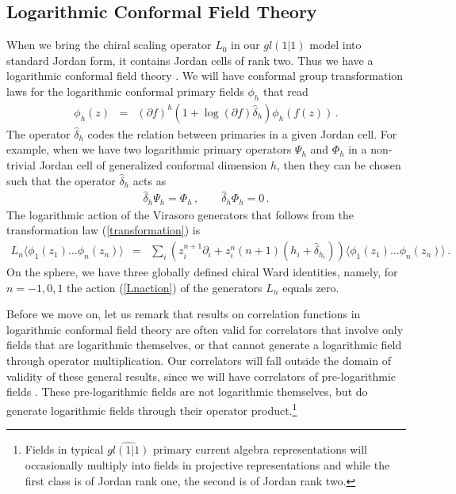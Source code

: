 \documentclass[12pt]{article}
\numberwithin{equation}{section}
\numberwithin{equation}{section}
\numberwithin{table}{section}\setlength{\multlinegap}{25pt}
\begin{document}
\subsection{Logarithmic Conformal Field Theory}
When we bring the chiral scaling operator $L_0$ in our $gl(1|1)$ model into standard Jordan form, it contains Jordan cells of rank
two. Thus we have a logarithmic conformal field theory \cite{Rozansky:1992rx}. 
We will have conformal group transformation laws for the 
logarithmic conformal primary fields $\phi_h$ that read \cite{Flohr:2001zs}
\begin{eqnarray}
\phi_h(z) &=& (\partial f)^h (1+ \log (\partial f) \hat{\delta}_h) \phi_h (f(z)) \, .
\label{transformation}
\end{eqnarray}
The operator $\hat{\delta}_h$ codes the relation between primaries in a given Jordan cell.
For example, when we have two logarithmic primary operators $\Psi_h$ and $\Phi_h$ in a non-trivial Jordan cell of generalized conformal dimension $h$,
then they can be chosen such that the operator $\hat{\delta}_h$ acts as
\begin{eqnarray}
\hat{\delta}_{h} \Psi_{h} = \Phi_{h} \, ,
\qquad
\hat{\delta}_{h} \Phi_{h} = 0  \, .
\end{eqnarray}
The logarithmic action of the Virasoro generators that follows from the transformation law (\ref{transformation}) is
\begin{eqnarray}
L_n \langle \phi_1(z_1) \dots \phi_n(z_n) \rangle
&=& \sum_i (z_i^{n+1} \partial_i + z_i^n (n+1) (h_i + \hat{\delta}_{h_i}))  \langle \phi_1(z_1) \dots \phi_n(z_n)  \rangle \, .
\label{Lnaction}
\end{eqnarray}
On the sphere, we have three globally defined chiral Ward identities, namely, for $n=-1,0,1$  the action (\ref{Lnaction}) of the
generators $L_n$ equals zero.




Before we move on, let us remark that results on correlation functions in logarithmic conformal
field theory are often valid for correlators that involve only fields that are logarithmic themselves, or
that cannot generate a logarithmic field through operator multiplication. Our correlators will fall outside the domain of validity of these general results,
since we will have correlators of pre-logarithmic fields \cite{Flohr:2001zs}.
These pre-logarithmic fields are not logarithmic themselves, but do generate logarithmic fields through
 their operator product.\footnote{Fields in typical $\widehat{gl(1|1)}$ primary current algebra representations will occasionally multiply into
fields in  projective representations and while the first class is of Jordan rank one,
the second is of Jordan rank two.}
\end{document}
